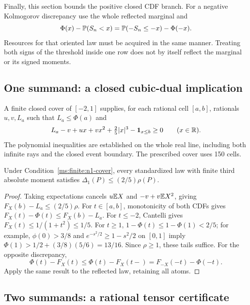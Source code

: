 Finally, this section bounds the positive closed CDF branch. For a negative
Kolmogorov discrepancy use the whole reflected marginal and
\[
 \Phi(x)-\mathbb P(S_n<x)=\mathbb P(-S_n\le-x)-\Phi(-x).
\]
Resources for that oriented law must be acquired in the same manner.
Treating both signs of the threshold inside one row does not by itself
reflect the marginal or its signed moments.



\subsection{One summand: a closed cubic-dual implication}
\label{ms:finite:n1}
\begin{condition}\label{ms:finite:n1-cover}
A finite closed cover of $[-2,1]$ supplies, for each rational cell $[a,b]$,
rationals $u,v,L_a$ such that $L_a\le\Phi(a)$ and
\[
 L_a-v+ux+vx^2+\tfrac25|x|^3-\mathbf 1_{x\le b}\ge0
 \qquad(x\in\mathbb R).
\]
The polynomial inequalities are established on the whole real line,
including both infinite rays and the closed event boundary. The prescribed
cover uses 150 cells.
\end{condition}
\begin{proposition}\label{ms:finite:n1-bound}
Under Condition~\ref{ms:finite:n1-cover}, every standardized law with
finite third absolute moment satisfies $\Delta_1(P)\le(2/5)\rho(P)$.
\end{proposition}
\begin{proof}
Taking expectations cancels $u\mathbb E X$ and $-v+v\mathbb E X^2$, giving
$F_X(b)-L_a\le(2/5)\rho$. For $t\in[a,b]$, monotonicity of both
CDFs gives $F_X(t)-\Phi(t)\le F_X(b)-L_a$.
For $t\le-2$, Cantelli gives $F_X(t)\le1/(1+t^2)\le1/5$.
For $t\ge1$, $1-\Phi(t)\le1-\Phi(1)<2/5$; for example,
$\phi(0)>3/8$ and $e^{-s^2/2}\ge1-s^2/2$ on $[0,1]$ imply
$\Phi(1)>1/2+(3/8)(5/6)=13/16$. Since $\rho\ge1$, these tails
suffice. For the opposite discrepancy,
\[
 \Phi(t)-F_X(t)\le\Phi(t)-F_X(t-)
   =F_{-X}(-t)-\Phi(-t).
\]
Apply the same result to the reflected law, retaining all atoms.
\end{proof}

\subsection{Two summands: a rational tensor certificate}\label{ms:finite:n2:section}
